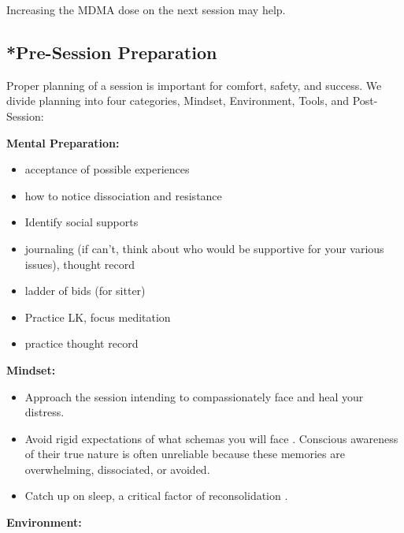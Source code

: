 \documentclass[12pt,letterpaper]{article}
\begin{document}
Increasing the MDMA dose on the next session may help. 
\subsection{*Pre-Session Preparation}
\label{prep}
Proper planning of a session is important for comfort, safety, and success. We divide planning into four categories, Mindset, Environment, Tools, and Post-Session:

\vspace{\baselineskip}

\noindent \textbf{Mental Preparation:}
\begin{itemize}
    \item acceptance of possible  experiences
    \item how to notice dissociation and resistance
    \item Identify social supports 
    \item journaling (if can't, think about who would be supportive for your various issues), thought record
    \item ladder of bids (for sitter)
    \item Practice LK, focus meditation
    \item practice thought record
\end{itemize}
\noindent \textbf{Mindset:}
\begin{itemize}
    \item Approach the session intending to compassionately face and heal your distress.
    \item Avoid rigid expectations of what schemas you will face \cite{mithoeferManual}. Conscious awareness of their true nature is often unreliable because these memories are overwhelming, dissociated, or avoided.
    \item Catch up on sleep, a critical factor of reconsolidation \cite{walkerSleep}.
\end{itemize}
\noindent \textbf{Environment:}
\end{document}
